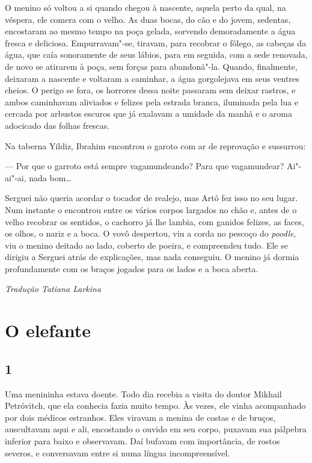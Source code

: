 O menino só voltou a si quando chegou à nascente, aquela perto da qual,
na véspera, ele comera com o velho. As duas bocas, do cão e do jovem,
sedentas, encostaram ao mesmo tempo na poça gelada, sorvendo
demoradamente a água fresca e deliciosa. Empurravam"-se, tiravam, para
recobrar o fôlego, as cabeças da água, que caía sonoramente de seus
lábios, para em seguida, com a sede renovada, de novo se atirarem à
poça, sem forças para abandoná"-la. Quando, finalmente, deixaram a
nascente e voltaram a caminhar, a água gorgolejava em seus ventres
cheios. O perigo se fora, os horrores dessa noite passaram sem deixar
rastros, e ambos caminhavam aliviados e felizes pela estrada branca,
iluminada pela lua e cercada por arbustos escuros que já exalavam a
umidade da manhã e o aroma adocicado das folhas frescas.

Na taberna Yildiz, Ibrahim encontrou o garoto com ar de reprovação e
sussurrou:

--- Por que o garroto está sempre vagamundeando? Para que vagamundear?
Ai"-ai"-ai, nada bom\ldots{}

Serguei não queria acordar o tocador de realejo, mas Artô fez isso no seu
lugar. Num instante o encontrou entre os vários corpos largados no chão
e, antes de o velho recobrar os sentidos, o cachorro já lhe lambia, com
ganidos felizes, as faces, os olhos, o nariz e a boca. O vovô despertou,
viu a corda no pescoço do \emph{poodle}, viu o menino deitado ao lado,
coberto de poeira, e compreendeu tudo. Ele se dirigiu a Serguei atrás de
explicações, mas nada conseguiu. O menino já dormia profundamente com os
braços jogados para os lados e a boca aberta.


\medskip

{\footnotesize\hfill\emph{Tradução Tatiana Larkina}}

\chapter{O elefante} \label{part11}

\section{1}

\noindent{}Uma menininha estava doente. Todo dia recebia a visita do doutor
Mikhail Petróvitch, que ela conhecia fazia muito tempo. Às vezes, ele
vinha acompanhado por dois médicos estranhos. Eles viravam a menina de
costas e de bruços, auscultavam aqui e ali, encostando o ouvido em seu
corpo, puxavam sua pálpebra inferior para baixo e observavam. Daí bufavam com importância, de rostos severos, e conversavam entre si numa
língua incompreensível.

